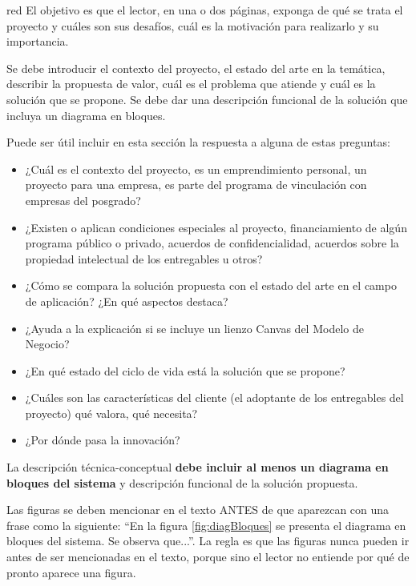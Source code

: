 \documentclass[
11pt, %
]{charter}
\begin{document}
\begin{consigna}{red} %
El objetivo es que el lector, en una o dos páginas, exponga de qué se trata el proyecto y cuáles son sus desafíos, cuál es la motivación para realizarlo y su importancia.

Se debe introducir el contexto del proyecto, el estado del arte en la temática, describir la propuesta de valor, cuál es el problema que atiende y cuál es la solución que se propone. Se debe dar una descripción funcional de la solución que incluya un diagrama en bloques.

Puede ser útil incluir en esta sección la respuesta a alguna de estas preguntas:

\begin{itemize}
	\item ¿Cuál es el contexto del proyecto, es un emprendimiento personal, un proyecto para una empresa, es parte del programa de vinculación con empresas del posgrado?
	\item ¿Existen o aplican condiciones especiales al proyecto, financiamiento de algún programa público o privado, acuerdos de confidencialidad, acuerdos sobre la propiedad intelectual de los entregables u otros?
	\item ¿Cómo se compara la solución propuesta con el estado del arte en el campo de aplicación? ¿En qué aspectos destaca?
	\item ¿Ayuda a la explicación si se incluye un lienzo Canvas del Modelo de Negocio?
	\item ¿En qué estado del ciclo de vida está la solución que se propone?
	\item ¿Cuáles son las características del cliente (el adoptante de los entregables del proyecto) qué valora, qué necesita?
	\item ¿Por dónde pasa la innovación?
\end{itemize}

La descripción técnica-conceptual \textbf{debe incluir al menos un diagrama en bloques del sistema} y descripción funcional de la solución propuesta.

Las figuras se deben mencionar en el texto ANTES de que aparezcan con una frase como la siguiente: ``En la figura \ref{fig:diagBloques} se presenta el diagrama en bloques del sistema. Se observa que...''.  La regla es que las figuras nunca pueden ir antes de ser mencionadas en el texto, porque sino el lector no entiende por qué de pronto aparece una figura.


\end{consigna}
\end{document}
